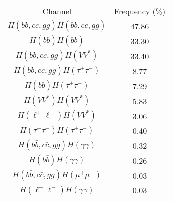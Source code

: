 \begin{tabular}{|c|c|}
\hline
  Channel & Frequency (\%) \\

$H(b\bar{b},c\bar{c},gg)H(b\bar{b},c\bar{c},gg)$ & 47.86 \\

$H(b\bar{b})H(b\bar{b})$ & 33.30 \\

$H(b\bar{b},c\bar{c},gg)H(VV^{*})$ & 33.40 \\

$H(b\bar{b},c\bar{c},gg)H(\tau^{+}\tau^{-})$ & 8.77    \\

$H(b\bar{b})H(\tau^{+}\tau^{-})$ & 7.29    \\

$H(VV^*)H(VV^{*})$ & 5.83  \\

$H(\ell^{+}\ell^{-})H(VV^{*})$ & 3.06   \\

$H(\tau^{+}\tau^{-})H(\tau^{+}\tau^{-})$ & 0.40 \\

%
$H(b\bar{b},c\bar{c},gg)H(\gamma\gamma)$ & 0.32   \\

$H(b\bar{b})H(\gamma\gamma)$ & 0.26   \\

$H(b\bar{b},c\bar{c},gg)H(\mu^{+}\mu^{-})$ & 0.03   \\

$H(\ell^{+}\ell^{-})H(\gamma\gamma)$ & 0.03   \\
\hline
\end{tabular}
